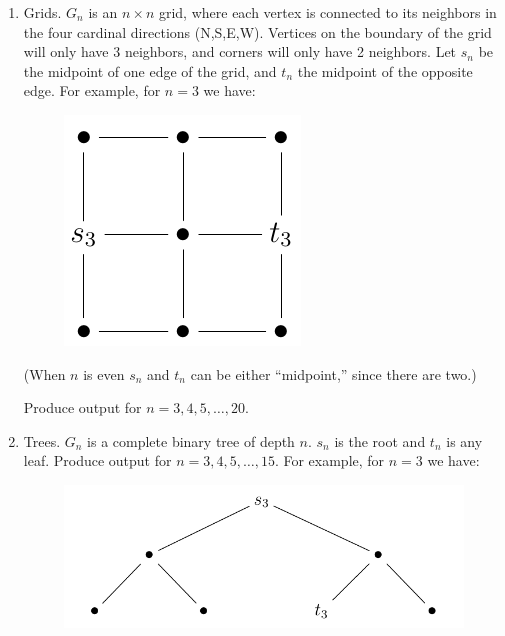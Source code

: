 \documentclass[12pt]{article}
\begin{document}
\begin{enumerate}
\begin{enumerate}
	\begin{enumerate}
	\item Grids. $G_n$ is an $n \times n$ grid, where each vertex is connected to its neighbors in the four cardinal directions (N,S,E,W). Vertices on the boundary of the grid will only have 3 neighbors, and corners will only have 2 neighbors. Let $s_n$ be the midpoint of one edge of the grid, and $t_n$ the midpoint of the opposite edge. For example, for $n=3$ we have:
    \begin{figure}[H]
    \begin{center}
    \includegraphics[scale=0.9]{grid.png} 
    \end{center}
    \end{figure}

	(When $n$ is even $s_n$ and $t_n$ can be either ``midpoint,'' since there are two.)
	
	Produce output for $n=3,4,5,\dotsc,20$.
	
	\item Trees. $G_n$ is a complete binary tree of depth $n$. $s_n$ is the root and $t_n$ is any leaf. Produce output for $n=3,4,5,\dotsc,15$. For example, for $n=3$ we have:
    \begin{figure}[H]
    \begin{center}
    \includegraphics[scale=0.6]{tree.png} 
    \end{center}
    \end{figure}
		

\end{enumerate}
\end{enumerate}
\end{enumerate}
\end{document}
